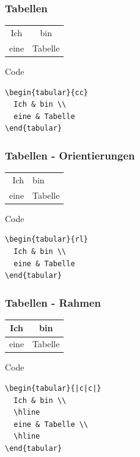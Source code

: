 \begin{frame}[fragile]
  \frametitle{Tabellen}

  \begin{example}
    \begin{tabular}{cc}
      Ich & bin \\
      eine & Tabelle
    \end{tabular}
  \end{example}
  \pause
  \begin{block}{Code}
    \begin{verbatim}
\begin{tabular}{cc}
  Ich & bin \\
  eine & Tabelle
\end{tabular}
    \end{verbatim}
  \end{block}
\end{frame}
\begin{frame}[fragile]
  \frametitle{Tabellen - Orientierungen}

  \begin{example}
    \begin{tabular}{rl}
      Ich & bin \\
      eine & Tabelle
    \end{tabular}
  \end{example}
  \pause
  \begin{block}{Code}
    \begin{verbatim}
\begin{tabular}{rl}
  Ich & bin \\
  eine & Tabelle
\end{tabular}
    \end{verbatim}
  \end{block}
\end{frame}
\begin{frame}[fragile]
  \frametitle{Tabellen - Rahmen}

  \begin{example}
    \begin{tabular}{|c|c|}
      Ich & bin \\
      \hline
      eine & Tabelle \\
      \hline
    \end{tabular}
  \end{example}
  \pause
  \begin{block}{Code}
    \begin{verbatim}
\begin{tabular}{|c|c|}
  Ich & bin \\
  \hline
  eine & Tabelle \\
  \hline
\end{tabular}
    \end{verbatim}
  \end{block}
\end{frame}
